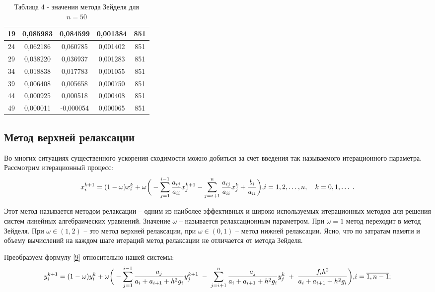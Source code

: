 \documentclass[a4paper,12pt]{article}
\begin{document}
{\begin{table}[h]
\begin{tabular}{|c|c|c|c|c|}
       19 &  0,085983 &  0,084599 &  0,001384 & 851 \\ \hline
       24 &  0,062186 &  0,060785 &  0,001402 & 851 \\ \hline
       29 &  0,038220 &  0,036937 &  0,001283 & 851 \\ \hline
       34 &  0,018838 &  0,017783 &  0,001055 & 851 \\ \hline
       39 &  0,006408 &  0,005658 &  0,000750 & 851 \\ \hline
       44 &  0,000925 &  0,000518 &  0,000408 & 851 \\ \hline
       49 &  0,000011 & -0,000054 &  0,000065 & 851 \\ \hline
    \end{tabular}
    \caption*{\small{Таблица 4 - значения метода Зейделя для $n = 50$}}
\end{table}
\clearpage
\subsection{Метод верхней релаксации}
\hspace{1.25cm}Во многих ситуациях существенного ускорения сходимости можно добиться за счет введения так называемого итерационного параметра. 
Рассмотрим итерационный процесс:
\begin{equation}
    x_i^{k+1}=(1-\omega)x_i^k+\omega \bigg( - \sum\limits_{j=1}^{i-1} \frac{a_{ij}}{a_{ii}}x_j^{k+1}- \sum\limits_{j=i+1}^{n} \frac{a_{ij}}{a_{ii}}x_j^{k}+\frac{b_i}{a_{ii}}\bigg),
    $$$$ i=1,2, \dots, n, \quad k=0,1, \dots \; .
    \label{9}
\end{equation}

Этот метод называется методом релаксации -- одним из наиболее эффективных и широко используемых итерационных 
методов для решения систем линейных алгебраичес\-ких уравнений. Значение $\omega $ -- называется релаксационным параметром. 
При $\omega = 1$ метод переходит в метод Зейделя. При $\omega \in (1,2)$ -- это метод верхней релаксации, при $\omega \in (0,1)$ -- метод нижней релаксации. 
Ясно, что по затратам памяти и объему вычислений на каждом шаге итераций метод релаксации не отличается от метода Зейделя.

Преобразуем формулу \eqref{9} относительно нашей системы:
\begin{equation}
    y_i^{k+1}=(1-\omega)y_i^k+\omega  \bigg(-\sum\limits_{j=1}^{i-1}\frac{a_j}{a_i+a_{i+1}+h^2 g_i}y_j^{k+1} \; - \;\sum\limits_{j=i+1}^{n}\frac{a_{j}}{a_i+a_{i+1}+h^2 g_i}y_j^k\; +\; \frac{f_i h^2}{a_i+a_{i+1}+h^2 g_i}\bigg),$$$$
    i=\overline{1, n-1};
    \label{10}
\end{equation}

}
\end{document}
